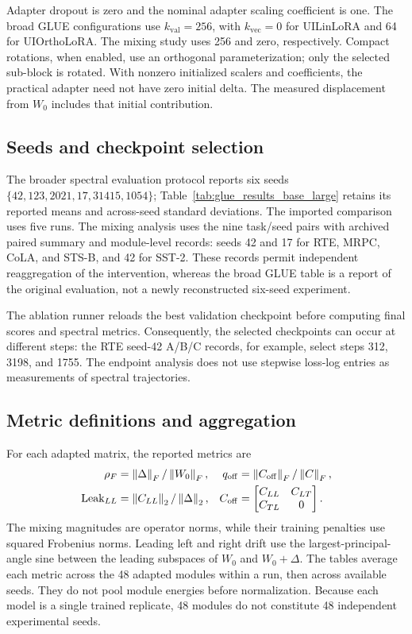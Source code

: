 Adapter dropout is zero and the nominal adapter scaling coefficient is one. The broad GLUE configurations use $k_{\mathrm{val}}=256$, with $k_{\mathrm{vec}}=0$ for UILinLoRA and 64 for UIOrthoLoRA. The mixing study uses 256 and zero, respectively. Compact rotations, when enabled, use an orthogonal parameterization; only the selected sub-block is rotated. With nonzero initialized scalers and coefficients, the practical adapter need not have zero initial delta. The measured displacement from $W_0$ includes that initial contribution.

\subsection{Seeds and checkpoint selection}
The broader spectral evaluation protocol reports six seeds $\{42,123,2021,17,31415,1054\}$; Table~\ref{tab:glue_results_base_large} retains its reported means and across-seed standard deviations. The imported comparison uses five runs. The mixing analysis uses the nine task/seed pairs with archived paired summary and module-level records: seeds 42 and 17 for RTE, MRPC, CoLA, and STS-B, and 42 for SST-2. These records permit independent reaggregation of the intervention, whereas the broad GLUE table is a report of the original evaluation, not a newly reconstructed six-seed experiment.

The ablation runner reloads the best validation checkpoint before computing final scores and spectral metrics. Consequently, the selected checkpoints can occur at different steps: the RTE seed-42 A/B/C records, for example, select steps 312, 3198, and 1755. The endpoint analysis does not use stepwise loss-log entries as measurements of spectral trajectories.

\subsection{Metric definitions and aggregation}
For each adapted matrix, the reported metrics are
\begin{align}
\rho_F&=\left\|\Delta\right\|_F/\left\|W_0\right\|_F,&
q_{\mathrm{off}}&=\left\|C_{\mathrm{off}}\right\|_F/\left\|C\right\|_F,\\
\mathrm{Leak}_{LL}&=\left\|C_{LL}\right\|_2/\left\|\Delta\right\|_2,&
C_{\mathrm{off}}&=\begin{bmatrix}C_{LL}&C_{LT}\\C_{TL}&0\end{bmatrix}.
\end{align}
The mixing magnitudes are operator norms, while their training penalties use squared Frobenius norms. Leading left and right drift use the largest-principal-angle sine between the leading subspaces of $W_0$ and $W_0+\Delta$. The tables average each metric across the 48 adapted modules within a run, then across available seeds. They do not pool module energies before normalization. Because each model is a single trained replicate, 48 modules do not constitute 48 independent experimental seeds.

